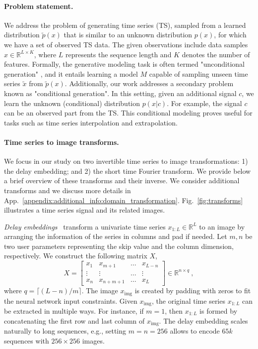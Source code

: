 \documentclass{article}
\begin{document}
\paragraph{Problem statement.} We address the problem of generating time series (TS), sampled from a learned distribution $\tilde{p}(x)$ that is similar to an unknown distribution $p(x)$, for which we have a set of observed TS data. The given observations include data samples $x \in \mathbb{R}^{L \times K}$, where $L$ represents the sequence length and $K$ denotes the number of features. Formally, the generative modeling task is often termed "unconditional generation" \cite{guo2022systematic}, and it entails learning a model $M$ capable of sampling unseen time series $\tilde{x}$ from $\tilde{p}(x)$. Additionally, our work addresses a secondary problem known as "conditional generation". In this setting, given an additional signal $c$, we learn the unknown (conditional) distribution $p(x|c)$. For example, the signal $c$ can be an observed part from the TS. This conditional modeling proves useful for tasks such as time series interpolation and extrapolation.

\paragraph{Time series to image transforms.} We focus in our study on two invertible time series to image transformations: 1) the delay embedding; and 2) the short time Fourier transform. We provide below a brief overview of these transforms and their inverse. We consider additional transforms and we discuss more details in App.~\ref{appendix:additional_info:domain_transformation}. Fig.~\ref{fig:transforms} illustrates a time series signal and its related images.

\emph{Delay embeddings}~\cite{takens2006detecting} transform a univariate time series $x_{1:L} \in \mathbb{R}^L$ to an image by arranging the information of the series in columns and pad if needed. Let $m, n$ be two user parameters representing the skip value and the column dimension, respectively. We construct the following matrix $X$,
\begin{equation}
    X = \begin{bmatrix}
        x_1 & x_{m+1}  & \dots  & x_{L-n} \\
        \vdots & \vdots & \dots & \vdots \\
        x_n & x_{n+m+1} & \dots & x_L
        \end{bmatrix} \in \mathbb{R}^{n \times q} \ ,
\end{equation}
where \( q = \lceil (L-n)/m \rceil \). The image $x_\text{img}$ is created by padding with zeros to fit the neural network input constraints. Given $x_\text{img}$, the original time series $x_{1:L}$ can be extracted in multiple ways. For instance, if $m=1$, then $x_{1:L}$ is formed by concatenating the first row and last column of $x_\text{img}$. The delay embedding scales naturally to long sequences, e.g., setting $m=n=256$ allows to encode $65k$ sequences with $256 \times 256$ images.
\end{document}
